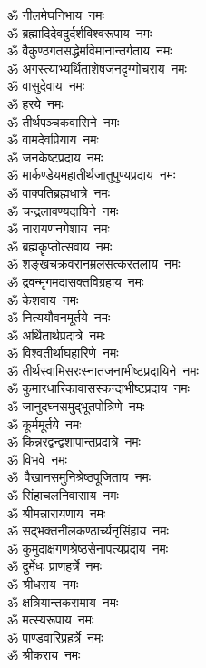 \begin{multicols}{2}
\begin{flushleft}
ॐ नीलमेघनिभाय~नमः\\
ॐ ब्रह्मादिदेवदुर्दर्शविश्वरूपाय~नमः\\
ॐ वैकुण्ठगत\-सद्धेमविमानान्तर्गताय~नमः\\
ॐ अगस्त्याभ्यर्थिताशेष\-जनदृग्गोचराय~नमः\\
ॐ वासुदेवाय~नमः\hfill{}\\
ॐ हरये~नमः\\
ॐ तीर्थपञ्चकवासिने~नमः\\
ॐ वामदेवप्रियाय~नमः\\
ॐ जनकेष्टप्रदाय~नमः\\
ॐ मार्कण्डेयमहातीर्थ\-जातुपुण्यप्रदाय~नमः\\
ॐ वाक्पतिब्रह्मधात्रे~नमः\\
ॐ चन्द्रलावण्यदायिने~नमः\\
ॐ नारायणनगेशाय~नमः\\
ॐ ब्रह्मकॄप्तोत्सवाय~नमः\\
ॐ शङ्खचक्रवरानम्रलसत्कर\-तलाय~\mbox{नमः~\hfill~}\\
ॐ द्रवन्मृगमदासक्तविग्रहाय~नमः\\
ॐ केशवाय~नमः\\
ॐ नित्ययौवनमूर्तये~नमः\\
ॐ अर्थितार्थप्रदात्रे~नमः\\
ॐ विश्वतीर्थाघहारिणे~नमः\\
ॐ तीर्थस्वामिसरःस्नात\-जनाभीष्टप्रदायिने~नमः\\
ॐ कुमारधारिकावास\-स्कन्दाभीष्टप्रदाय~नमः\\
ॐ जानुदघ्नसमुद्भूतपोत्रिणे~नमः\\
ॐ कूर्ममूर्तये~नमः\\
ॐ किन्नरद्वन्द्वशापान्त\-प्रदात्रे~नमः\hfill{}\\
ॐ विभवे~नमः\\
ॐ~वैखानसमुनिश्रेष्ठपूजिताय~नमः\\
ॐ सिंहाचलनिवासाय~नमः\\
ॐ श्रीमन्नारायणाय~नमः\\
ॐ सद्भक्तनीलकण्ठार्च्य\-नृसिंहाय~नमः\\
ॐ कुमुदाक्षगणश्रेष्ठसेनापत्य\-प्रदाय~नमः\\
ॐ दुर्मेधः प्राणहर्त्रे~नमः\\
ॐ श्रीधराय~नमः\\
ॐ क्षत्रियान्तकरामाय~नमः\\
ॐ मत्स्यरूपाय~नमः\hfill{}\\
ॐ पाण्डवारिप्रहर्त्रे~नमः\\
ॐ श्रीकराय~नमः\\

\end{flushleft}
\end{multicols}
